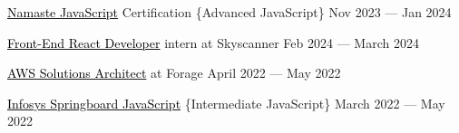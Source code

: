 
\href{https://namastedev.com/officialkiranmahajan/certificates/namaste-javascript}{\textcolor{black}{Namaste JavaScript}} Certification \{Advanced JavaScript\} \hfill Nov 2023 --- Jan 2024
 
\href{https://forage-uploads-prod.s3.amazonaws.com/completion-certificates/Skyscanner/km4rw7dihDr3etqom_Skyscanner_Pd97Zax7EJjPcZEmo_1709363665958_completion_certificate.pdf}{\textcolor{black}{Front-End React Developer}} intern at Skyscanner 
   \hfill Feb 2024 --- March 2024


 \href{https://forage-uploads-prod.s3.amazonaws.com/completion-certificates/AWS/kkE9HyeNcw6rwCRGw_AWS%20APAC_Pd97Zax7EJjPcZEmo_1653728049277_completion_certificate.pdf}{\textcolor{black}{AWS Solutions Architect}} at Forage \hfill April 2022 --- May 2022

  \href{https://drive.google.com/file/d/1UkqxfIVxQrNCxYwKFYY2eXQN0RVLOkSJ/view?usp=sharing}{\textcolor{black}{Infosys Springboard JavaScript}} \{Intermediate JavaScript\}  \hfill March 2022 --- May 2022



